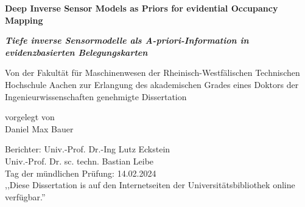 
\begin{titlepage}
  \centering
  \begin{minipage}[t]{9.8cm}
      \begin{center}
          {\large \textbf{Deep Inverse Sensor Models as Priors for evidential Occupancy Mapping}}
          \bigskip
      \end{center}
  \end{minipage}
  \begin{minipage}[t]{9.8cm}
      \begin{center}
          {\large \textcolor{ikagrey}{\textit{\textbf{Tiefe inverse Sensormodelle als A-priori-Information in evidenzbasierten Belegungskarten}}}}
          \bigskip
      \end{center}
  \end{minipage}
  \vfill
  \begin{minipage}[t]{16.5cm}
      \begin{center}
          Von der Fakultät für Maschinenwesen der Rheinisch-Westfälischen Technischen Hochschule Aachen zur Erlangung des akademischen Grades eines Doktors der Ingenieurwissenschaften genehmigte Dissertation
      \end{center}
  \end{minipage}
  \vfill
  \begin{minipage}[t]{9.8cm}
      \begin{center}
      	vorgelegt von\\
      	\vspace{\baselineskip}
          Daniel Max Bauer
      \end{center}
  \end{minipage}
\vfill
\begin{minipage}[t]{16.5cm}
	\raggedright
	Berichter: Univ.-Prof. Dr.-Ing Lutz Eckstein\\
	\phantom{Berichter:} Univ.-Prof. Dr. sc. techn. Bastian Leibe\\ 
	\vspace{\baselineskip}
	Tag der mündlichen Prüfung: 14.02.2024\\
	\vspace{\baselineskip}
	,,Diese Dissertation is auf den Internetseiten der Universitätsbibliothek online verfügbar.''
\end{minipage}
\vfill
\end{titlepage}
\restoregeometry

